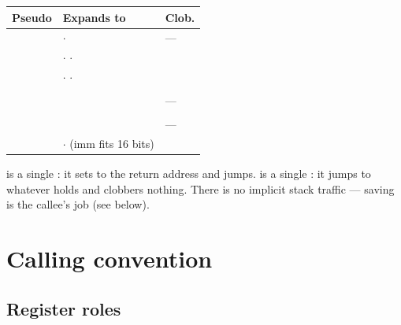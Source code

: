 \documentclass[11pt]{article}
\begin{document}
\begin{center}
\begin{tabular}{@{}L{2.6cm} L{9.2cm} C{1.3cm}@{}}
\toprule
\textbf{Pseudo} & \textbf{Expands to} & \textbf{Clob.} \\
\midrule
{}   &  $\cdot$  & --- \\
      &  $\cdot$  $\cdot$  &  \\
       &  $\cdot$  $\cdot$  &  \\
   &  &  \\
          &  & --- \\
    &  &  \\
       &  & --- \\
 &  $\cdot$  \; (imm fits 16 bits) &  \\
\bottomrule
\end{tabular}
\end{center}

\noindent {} is a single : it sets  to the
return address and jumps.  is a single : it jumps to
whatever  holds and clobbers nothing. There is no implicit stack traffic
--- saving  is the callee's job (see below).

\section{Calling convention}

\subsection{Register roles}
\end{document}
